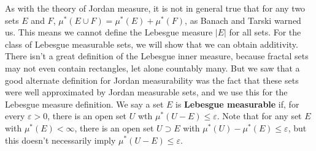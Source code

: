 
As with the theory of Jordan measure, it is not in general true that for any two sets $E$ and $F$, $\mu^*(E \cup F) = \mu^*(E) + \mu^*(F)$, as Banach and Tarski warned us. This means we cannot define the Lebesgue measure $|E|$ for all sets. For the class of Lebesgue measurable sets, we will show that we can obtain additivity. There isn't a great definition of the Lebesgue inner measure, because fractal sets may not even contain rectangles, let alone countably many. But we saw that a good alternate definition for Jordan measurability was the fact that these sets were well approximated by Jordan measurable sets, and we use this for the Lebesgue measure definition. We say a set $E$ is {\bf Lebesgue measurable} if, for every $\varepsilon > 0$, there is an open set $U$ wth $\mu^*(U - E) \leq \varepsilon$. Note that for any set $E$ with $\mu^*(E) < \infty$, there is an open set $U \supset E$ with $\mu^*(U) - \mu^*(E) \leq \varepsilon$, but this doesn't necessarily imply $\mu^*(U - E) \leq \varepsilon$.

